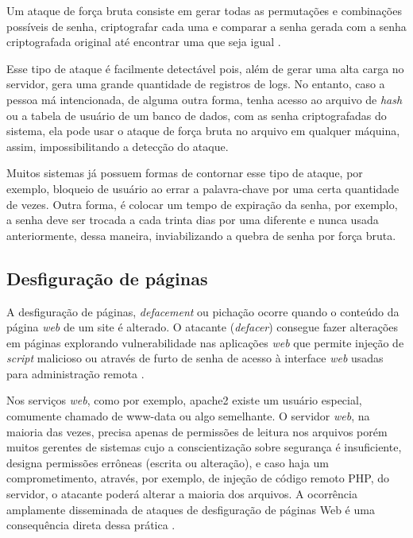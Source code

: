  Um ataque de força bruta consiste em gerar todas as permutações e combinações possíveis de senha, criptografar cada uma e comparar a senha gerada com a senha criptografada original até encontrar uma que seja igual \cite{md5crack2012}. 

 Esse tipo de ataque é facilmente detectável pois, além de gerar uma alta carga no servidor, gera uma grande quantidade de registros de logs. No entanto, caso a pessoa má intencionada, de alguma outra forma, tenha acesso ao arquivo de \textit{hash} ou a tabela de usuário de um banco de dados, com as senha criptografadas do sistema, ela pode usar o ataque de força bruta no arquivo em qualquer máquina, assim, impossibilitando a detecção do ataque.

 Muitos sistemas já possuem formas de contornar esse tipo de ataque, por exemplo, bloqueio de usuário ao errar a palavra-chave por uma certa quantidade de vezes. Outra forma, é colocar um tempo de expiração da senha, por exemplo, a senha deve ser trocada a cada trinta dias por uma diferente e nunca usada anteriormente, dessa maneira, inviabilizando a quebra de senha por força bruta. 

 \subsection{Desfiguração de páginas} \label{sec:desfiguração}

 A desfiguração de páginas, \textit{defacement} ou pichação ocorre quando o conteúdo da página \textit{web} de um site é alterado. O atacante (\textit{defacer}) consegue fazer alterações em páginas explorando vulnerabilidade nas aplicações \textit{web} que permite injeção de \textit{script} malicioso ou através de furto de senha de acesso à interface \textit{web} usadas para administração remota \cite{certs-ataques}.

 Nos serviços \textit{web}, como por exemplo, apache2 existe um usuário especial, comumente chamado de www-data ou algo semelhante. O servidor \textit{web}, na maioria das vezes, precisa apenas de permissões de leitura nos arquivos porém muitos gerentes de sistemas cujo a conscientização sobre segurança é insuficiente, designa permissões errôneas (escrita ou alteração), e caso haja um comprometimento, através, por exemplo, de injeção de código remoto PHP, do servidor, o atacante poderá alterar a maioria dos arquivos. A ocorrência amplamente disseminada de ataques de desfiguração de páginas Web é uma consequência direta dessa prática \cite{seguranca:william-lawrie}.

